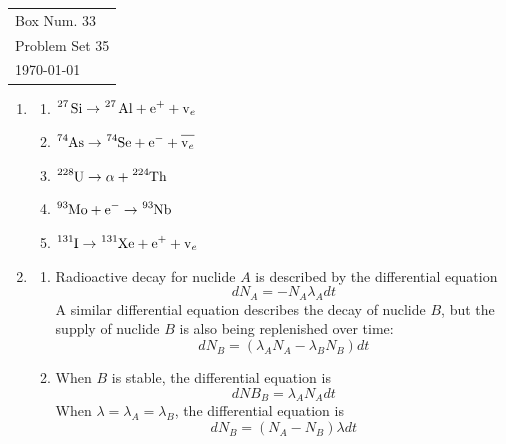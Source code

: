 \documentclass[10pt]{article}
\begin{document}
  \begin{tabular}{l}
    Box Num. 33 \\
    Problem Set 35 \\
    \today
  \end{tabular}

  \begin{enumerate}
    \item \begin{enumerate}
        \item $\ce{^{27} Si} \to \ce{^{27} Al} + \ce{e^+} + \ce{v_e}$
        \item $\ce{^{74}As} \to \ce{^{74}Se} + \ce{e^-} + \overline{\ce{v_e}}$
        \item $\ce{^{228}U} \to \alpha + \ce{^{224}Th}$
        \item $\ce{^{93}Mo} + \ce{e^-} \to \ce{^{93}Nb}$
        \item $\ce{^{131}I} \to \ce{^{131}Xe} + \ce{e+} + \ce{v_e}$
    \end{enumerate}

    \item \begin{enumerate}
        \item Radioactive decay for nuclide $A$ is described by the differential equation
        \begin{equation*}
            dN_A = -N_A\lambda_A dt
        \end{equation*}
        A similar differential equation describes the decay of nuclide $B$, but the supply of nuclide $B$ is also being replenished over time:
        \begin{equation*}
            dN_B = (\lambda_A N_A - \lambda_B N_B)dt
        \end{equation*}

        \item When $B$ is stable, the differential equation is
        \begin{equation*}
            dNB_B = \lambda_A N_A dt
        \end{equation*}
        When $\lambda=\lambda_A=\lambda_B$, the differential equation is
        \begin{equation*}
            dN_B = (N_A- N_B)\lambda dt
        \end{equation*}


\end{enumerate}
\end{enumerate}
\end{document}
